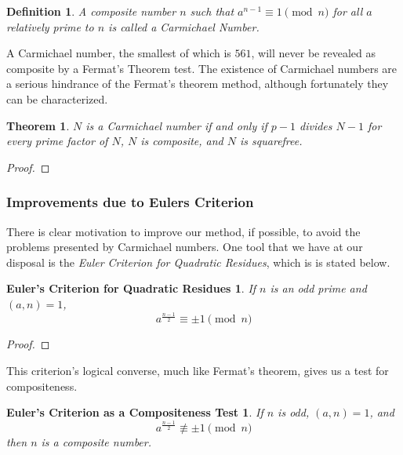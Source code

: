 \documentclass{article}
\newtheorem*{theorem}{Theorem}
\newtheorem*{definition}{Definition}
\begin{document}
 \begin{definition}
  A composite number $n$ such that $a^{n -1} \equiv 1 \pmod n$ for all $a$ relatively prime to $n$ is called a \textit{Carmichael Number}.
 \end{definition}
 
 A Carmichael number, the smallest of which is $561$, will never be revealed as composite by a Fermat's Theorem test. The existence of Carmichael numbers are a serious hindrance of the Fermat's theorem method, although fortunately they can be characterized.

\begin{theorem} $N$ is a Carmichael number if and only if $p-1$ divides $N-1$ for every prime factor of $N$, $N$ is composite, and $N$ is squarefree.
\end{theorem}

\begin{proof}
\end{proof}


\subsubsection{Improvements due to Eulers Criterion}

There is clear motivation to improve our method, if possible, to avoid the problems presented by Carmichael numbers. One tool that we have at our disposal is the \textit{Euler Criterion for Quadratic Residues}, which is is stated below.

\newtheorem*{eulercriterion}{Euler's Criterion for Quadratic Residues}
\newtheorem*{eulerconverse}{Euler's Criterion as a Compositeness Test}

\begin{eulercriterion}
If $n$ is an odd prime and $(a,n) = 1$, 
$$a^{\frac{n-1}{2}} \equiv \pm 1 \pmod n$$
\end{eulercriterion}
\begin{proof}
\end{proof}

This criterion's logical converse, much like Fermat's theorem, gives us a test for compositeness.
\begin{eulerconverse}
If $n$ is odd, $(a,n) = 1$, and
	$$a^{\frac{n-1}{2}} \not\equiv \pm 1 \pmod n$$
	then $n$ is a composite number.
\end{eulerconverse}
\end{document}
